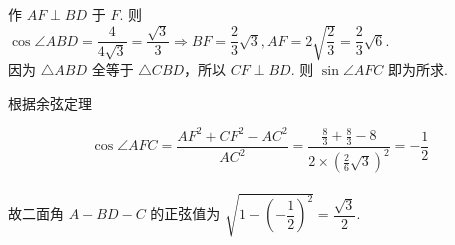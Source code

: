 \documentclass[UTF8]{ctexart}
\begin{document}
\noindent 作 $AF \perp BD$ 于 $F$. 则 $\cos \angle ABD=\dfrac{4}{4 \sqrt 3}=\dfrac{\sqrt 3}{3} \Rightarrow BF=\dfrac{2}{3} \sqrt 3, AF=2 \sqrt{\dfrac{2}{3}}=\dfrac{2}{3} \sqrt 6$. \\

\noindent 因为 $\triangle ABD$ 全等于 $\triangle CBD$，所以 $CF \perp BD$. 则 $\sin \angle AFC$ 即为所求.

\noindent 根据余弦定理

$$\cos \angle AFC=\dfrac{AF^2+CF^2-AC^2}{AC^2}=\dfrac{\frac{8}{3}+\frac{8}{3}-8}{2 \times (\frac{2}{6} \sqrt 3)^2}=-\dfrac{1}{2}$$ \\

\noindent 故二面角 $A-BD-C$ 的正弦值为 $\sqrt{1-(-\dfrac{1}{2})^2}=\dfrac{\sqrt 3}{2}$.
\end{document}
